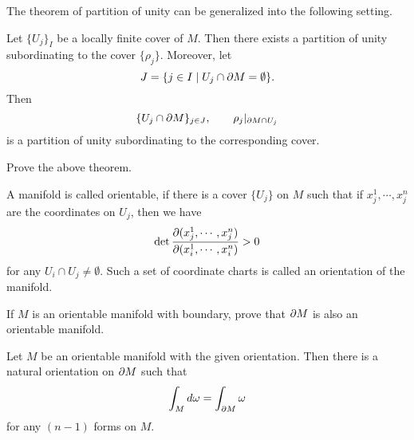 The theorem of partition of unity can be generalized into the following setting.

\begin{theorem}
Let $\{U_j\}_I$ be a locally finite cover of $M$. Then there exists a partition of unity subordinating to the cover $\{\rho_j\}$. Moreover, let 
\[
J=\{j\in I\mid U_j\cap \partial M=\emptyset\}.
\]
Then
\[
\{U_j\cap\partial M\}_{j\in J},\qquad \rho_j|_{\partial M\cap U_j}
\]
is a partition of unity subordinating to the corresponding cover.
\end{theorem}

\begin{ex} Prove the above theorem.\end{ex}

 A manifold is called orientable, if there is a cover $\{U_j\}$ on $M$ such that if $x_j^1,\cdots,x_j^n$ are the coordinates on $U_j$, then we have
\[
\det\frac{\partial (x_j^1,\cdots,x_j^n)}{\partial(x_i^1,\cdots,x_i^n)}>0
\]
for any $U_i\cap U_j\neq\emptyset$. Such a set of coordinate charts is called an orientation of the manifold.


\begin{ex} If $M$ is an orientable manifold with boundary, prove that $\partial M$ is also an orientable manifold.\end{ex}

\begin{theorem} Let $M$ be an orientable manifold with the given orientation. Then there is a natural orientation on $\partial M$ such that 
\[
\int_M d\omega=\int_{\partial M}\omega
\]
 for any $(n-1)$ forms on $M$.
\end{theorem}


